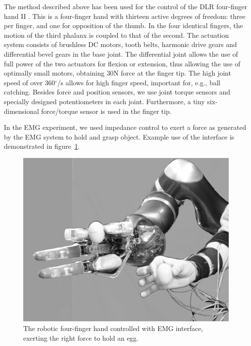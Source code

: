 
The method described above has been used for the control of the DLR
four-finger hand II \cite{ButFisGre2004}.  This is a four-finger hand with thirteen active degrees of freedom: three
per finger, and one for opposition of the thumb.  In the four
identical fingers, the motion of the third phalanx is coupled to that
of the second.  The actuation system consists of brushless DC motors,
tooth belts, harmonic drive gears and differential bevel gears in the
base joint.  The differential joint allows the use of full power of
the two actuators for flexion or extension, thus allowing the use of
optimally small motors, obtaining 30N force at the finger tip.  The
high joint speed of over 360$^\circ$/s allows for high finger speed,
important for, e.g., ball catching.  Besides force and position
sensors, we use joint torque sensors and specially designed
potentiometers in each joint.  Furthermore, a tiny six-dimensional
force/torque sensor is used in the finger tip.

In the EMG experiment, we used impedance control to exert a force as generated
by the EMG system to hold and grasp object.  Example use of the interface is demonstrated in
figure~\ref{fig:egg-hand}.
\begin{figure}
\includegraphics[width=\columnwidth]{figs/egg-in-hand.jpg}
\caption{The robotic four-finger hand controlled with EMG interface, exerting the right force to hold an egg.}
\label{fig:egg-hand}
\end{figure}


